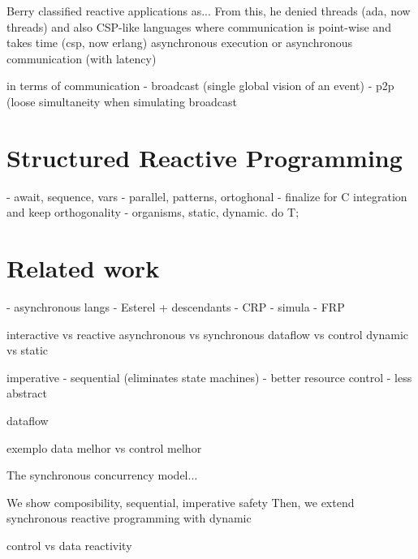 \documentclass{acm_proc_article-sp}
\newcommand{\1}{\;}
\newcommand{\2}{\;\;}
\newcommand{\3}{\;\;\;}
\newcommand{\5}{\;\;\;\;\;}
\begin{document}
Berry classified reactive applications as...
From this, he denied threads (ada, now threads) and also CSP-like languages 
where communication is point-wise and takes time (csp, now erlang)
asynchronous execution or asynchronous communication (with latency)

in terms of communication
- broadcast (single global vision of an event)
- p2p (loose simultaneity when simulating broadcast

\section{Structured Reactive Programming}
\label{sec.ceu}

- await, sequence, vars
- parallel, patterns, ortoghonal
- finalize for C integration and keep orthogonality
- organisms, static, dynamic. do T;

\section{Related work}

- asynchronous langs
- Esterel + descendants
- CRP
- simula
- FRP

interactive  vs reactive
asynchronous vs synchronous
dataflow vs control
dynamic vs static

imperative
    - sequential (eliminates state machines)
    - better resource control
    - less abstract

dataflow

exemplo data melhor vs control melhor

The synchronous concurrency model...

We show composibility, sequential, imperative
safety
Then, we extend synchronous reactive programming with dynamic

control vs data reactivity
\end{document}
